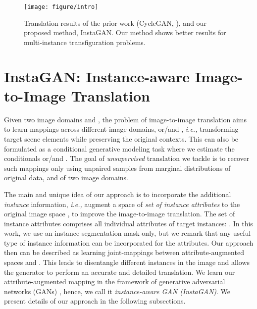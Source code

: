 \documentclass{article} \usepackage{iclr2019_conference,times}
\begin{document}
\begin{figure}[t]
\vspace{-0.25in}
\centering
\texttt{[image: figure/intro]}
\caption{
Translation results of the prior work (CycleGAN, \citet{zhu2017unpaired}), and our proposed method, InstaGAN.
Our method shows better results for multi-instance transfiguration problems.
} \label{fig:motivation}
\vspace{-0.15in}
\end{figure}





 \vspace{-0.05in}
\section{InstaGAN: Instance-aware Image-to-Image Translation}
\label{sec:method}
\vspace{-0.05in}

Given two image domains  and , the problem of image-to-image translation aims to learn
mappings across different image domains,  or/and , \textit{i.e.,} transforming target scene elements while preserving the {original contexts.} This can also be formulated as a conditional generative modeling task where we estimate the conditionals  or/and . 
The goal of {\it unsupervised} translation we tackle is to recover such mappings only using unpaired
samples from marginal distributions of original data,
 and  of two image domains.

The main and unique idea of our approach is to incorporate the additional \textit{instance} information,
\textit{i.e.,} augment a space of \textit{set of instance attributes}  to the original image space ,
to improve the image-to-image translation.
The set of instance attributes  comprises all individual attributes of  target instances: . In this work, we use an instance segmentation mask only, but we remark that any useful type of instance information can be incorporated for the attributes. 
Our approach then can be described as learning joint-mappings between attribute-augmented spaces 
 and .
This leads to disentangle different instances in the image
and allows the generator to perform an accurate and detailed translation.
We learn our attribute-augmented mapping in the framework of generative adversarial networks (GANs) \citep{goodfellow2014generative},
hence, we call it \textit{instance-aware GAN (InstaGAN)}. 
We present details of our approach in the following subsections. 
\end{document}
